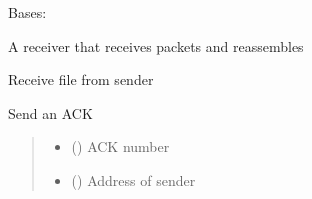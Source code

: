 \documentclass[letterpaper,10pt,english]{sphinxmanual}
\begin{document}
\begin{fulllineitems}
\label{\detokenize{receiver:receiver.Receiver}}
\pysigstartsignatures
\pysiglinewithargsret
{}
{\sphinxparamcomma {}}
{}
\pysigstopsignatures
\sphinxAtStartPar
Bases: 

\sphinxAtStartPar
A receiver that receives packets and reassembles

\begin{fulllineitems}
\label{\detokenize{receiver:receiver.Receiver.receive_file}}
\pysigstartsignatures
\pysiglinewithargsret
{}
{}
{}
\pysigstopsignatures
\sphinxAtStartPar
Receive file from sender

\end{fulllineitems}


\begin{fulllineitems}
\label{\detokenize{receiver:receiver.Receiver.send_ack}}
\pysigstartsignatures
\pysiglinewithargsret
{}
{\sphinxparamcomma {}}
{}
\pysigstopsignatures
\sphinxAtStartPar
Send an ACK
\begin{quote}\begin{description}
\begin{itemize}
\item {} 
\sphinxAtStartPar
{} () \textendash{} ACK number

\item {} 
\sphinxAtStartPar
{} () \textendash{} Address of sender

\end{itemize}

\end{description}\end{quote}

\end{fulllineitems}


\end{fulllineitems}
\end{document}
